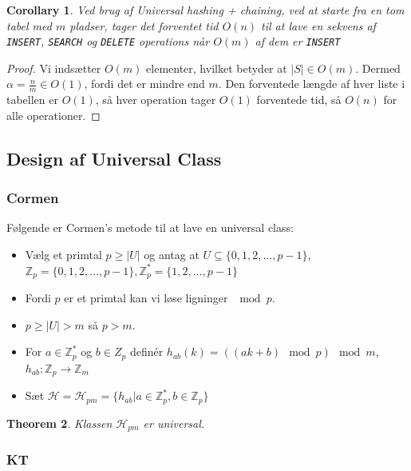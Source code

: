 \documentclass[11pt]{article}
\newtheorem{theorem}{Theorem}
\newtheorem{corollary}[theorem]{Corollary}
\theoremstyle{definition}
\theoremstyle{remark}
\begin{document}
\begin{corollary}
 Ved brug af Universal hashing + chaining, ved at starte fra en tom tabel med $m$ pladser, tager det forventet tid $O(n)$ til at lave en sekvens af \texttt{INSERT}, \texttt{SEARCH} og \texttt{DELETE} operations når $O(m)$ af dem er \texttt{INSERT}
\end{corollary}

\begin{proof}

  Vi indsætter $O(m)$ elementer, hvilket betyder at $|S| \in O(m)$. Dermed $\alpha = \frac{n}{m} \in O(1)$, fordi det er mindre end $m$.
  Den forventede længde af hver liste i tabellen er $O(1)$, så hver operation tager $O(1)$ forventede tid, så $O(n)$ for alle operationer. 
\end{proof}


\subsection{Design af Universal Class}

\subsubsection{Cormen}

Følgende er Cormen's metode til at lave en universal class:

\begin{itemize}
\item Vælg et primtal $p \geq |U|$ og antag at $U \subseteq \{0, 1, 2, \ldots, p-1\}$, $\mathbb{Z}_{p} = \{0,1,2, \ldots, p-1\}, \mathbb{Z}_{p}^{*} = \{1, 2, \ldots, p-1\}$
\item Fordi $p$ er et primtal kan vi løse ligninger $\mod p$.
\item $p \geq |U| > m$ så $p > m$.
\item For $a \in \mathbb{Z}_{p}^{*}$ og $b \in Z_{p}$ definér $h_{ab}(k) = ((ak+b) \mod p) \mod m$, $h_{ab} : \mathbb{Z}_{p} \rightarrow \mathbb{Z}_{m}$
\item Sæt $\mathcal{H} = \mathcal{H}_{pm} = \{h_{ab} | a \in \mathbb{Z}_{p}^{*}, b \in \mathbb{Z}_{p}\}$
\end{itemize}


\begin{theorem}
  Klassen $\mathcal{H}_{pm}$ er universal.
\end{theorem}


\subsubsection{KT}
\end{document}
